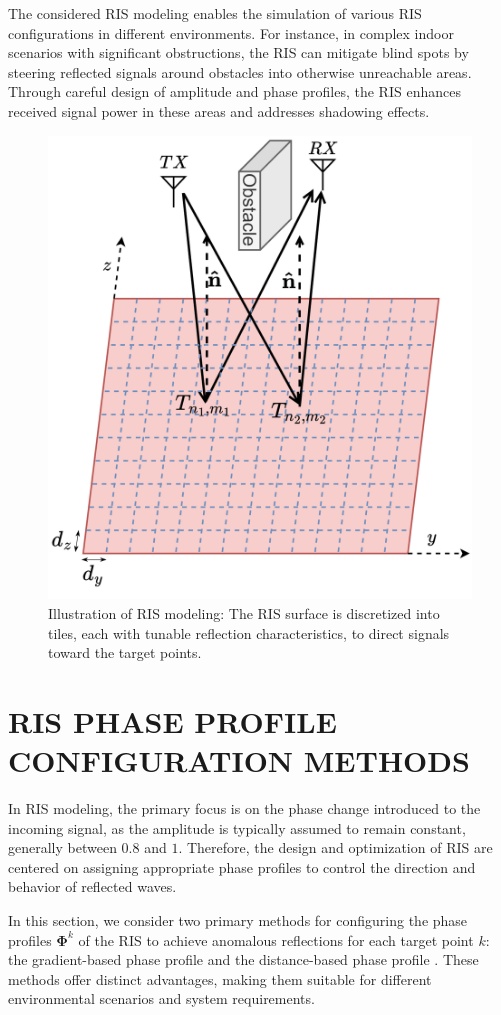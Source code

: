 \documentclass{IEEEoj}
\begin{document}
The considered RIS modeling enables the simulation of various RIS configurations in different environments. For instance, in complex indoor scenarios with significant obstructions, the RIS can mitigate blind spots by steering reflected signals around obstacles into otherwise unreachable areas. Through careful design of amplitude and phase profiles, the RIS enhances received signal power in these areas and addresses shadowing effects.

\begin{figure}
	\centering \includegraphics[width=.8\linewidth]{RIS_Modeling.png}
	\caption{Illustration of RIS modeling: The RIS surface is discretized into tiles, each with tunable reflection characteristics, to direct signals toward the target points.}
	\label{RIS_Modeling}
\end{figure}

\section{RIS PHASE PROFILE CONFIGURATION METHODS}
In RIS modeling, the primary focus is on the phase change introduced to the incoming signal, as the amplitude is typically assumed to remain constant, generally between $0.8$ and $1$. Therefore, the design and optimization of RIS are centered on assigning appropriate phase profiles to control the direction and behavior of reflected waves.

In this section, we consider two primary methods for configuring the phase profiles $\mathbf{\Phi}^k$ of the RIS to achieve anomalous reflections for each target point $k$: the gradient-based phase profile \cite{phase_grad_paper} and the distance-based phase profile \cite{Tang}. These methods offer distinct advantages, making them suitable for different environmental scenarios and system requirements.
\end{document}
